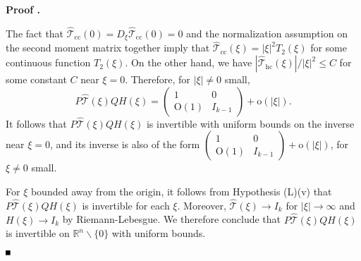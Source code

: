 \documentclass[10pt]{article}
\newenvironment{Proof}[1][\unskip]%
 {\begin{trivlist} \item[]{\bf Proof #1. }}%
 {\hspace*{\fill}$\rule{.4\baselineskip}{.4\baselineskip}$\end{trivlist}}
\newcommand{\R}{\mathbb{R}}
\newcommand{\rmO}{\mathrm{O}}
\newcommand{\rmo}{\mathrm{o}}
\newcommand{\That}{\widehat{\mathcal{T}}}
\begin{document}
\begin{Proof}
\iffalse
  |\xi|^2+o(|\xi|^2) &  \cdots \rmO(|\xi|^2)\cdots \\ \hline
  \vdots & \raisebox{-10pt}{{\large\mbox{{$I_{k-1}+\rmO(|\xi|^2)$}}}} \\[-4ex]
  \rmO(|\xi|^2) & \\[-0.5ex]
  \vdots &
\end{array}\right)\left(
\begin{array}{c|c}
  \frac{1+|\xi|^2}{|\xi|^2} & 0 \cdots 0 \\ \hline
  0 & \raisebox{-10pt}{{\large\mbox{{$I_{k-1}$}}}} \\[-4ex]
  \vdots & \\[-0.5ex]
  0 &
\end{array}\right)\\
&= \left(
\begin{array}{c|c}
  1+\frac{o(|\xi|^2)}{|\xi|^2} + |\xi|^2+o(|\xi|^2) &  \cdots \rmO(|\xi|^2)\cdots \\ \hline
  \vdots & \raisebox{-10pt}{{\large\mbox{{$I_{k-1}+\rmO(|\xi|^2)$}}}} \\[-4ex]
  \rmO(1) & \\[-0.5ex]
  \vdots &
\end{array}\right) .
\end{align*} 
\fi
The fact that $\That_\mathrm{cc}(0) = D_{\xi}\That_\mathrm{cc}(0) = 0$ and the normalization assumption on the second moment matrix together imply that $\That_\mathrm{cc}(\xi)=|\xi|^2 T_2(\xi)$ for some continuous function $T_2(\xi)$. On the other hand, we have $|\That_\mathrm{hc}(\xi)|/|\xi|^2 \le C$ for some constant $C$ near $\xi = 0$. Therefore, for $|\xi|\neq 0$ small, 
\[
P\That(\xi)QH(\xi)=
\begin{pmatrix}
1 & 0\\ 
\rmO(1) & I_{k-1}
\end{pmatrix} + \rmo(|\xi|). 
\]
It follows that $P\That(\xi)QH(\xi)$ is invertible with uniform bounds on the inverse near $\xi =0$, and its inverse is also of the form $
\begin{pmatrix}
1 & 0\\ 
\rmO(1) & I_{k-1}
\end{pmatrix} + \rmo(|\xi|)
$, for $\xi \neq 0$ small.

For $\xi$ bounded away from the origin, it follows from Hypothesis (L)(v) that $P\That(\xi)QH(\xi)$ is invertible for each $\xi$. Moreover, $\That(\xi) \to I_k$ for $|\xi|\to \infty$  and $H(\xi) \to I_k$ by Riemann-Lebesgue. We therefore conclude that $P\That(\xi)QH(\xi)$ is  invertible on $\R^n\backslash\{0\}$ with uniform bounds.


\end{Proof}
\end{document}
